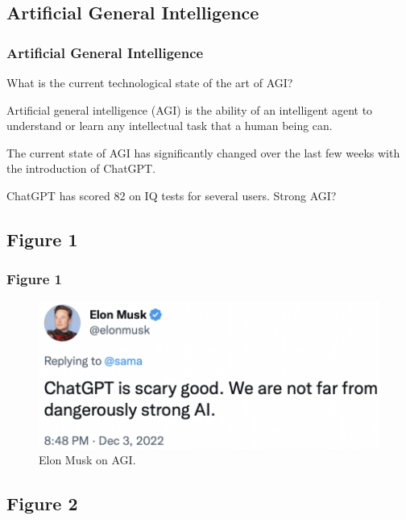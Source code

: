 \documentclass[
	11pt, %
]{beamer}
\begin{document}

\subsection{Artificial General Intelligence}

\begin{frame}
	\frametitle{Artificial General Intelligence}
What is the current technological state of the art of AGI?

\bigskip %

 Artificial general intelligence (AGI) is the ability of an intelligent agent to understand or learn any intellectual task that a human being can.

 \bigskip %
 
 The current state of AGI has significantly changed over the last few weeks with the introduction of \alert{ChatGPT}. 
	
	\bigskip %
	
	ChatGPT has scored 82 on IQ tests for several users. Strong AGI?
 
\end{frame}
\iffalse
\subsection{Figure 1}

\begin{frame}
	\frametitle{Figure 1}
	
	\begin{figure}
        \includegraphics[width=0.8\linewidth]{Images/musk.png}
        \caption{Elon Musk on AGI.}
    \end{figure}

\end{frame}

\subsection{Figure 2}
\end{document}
